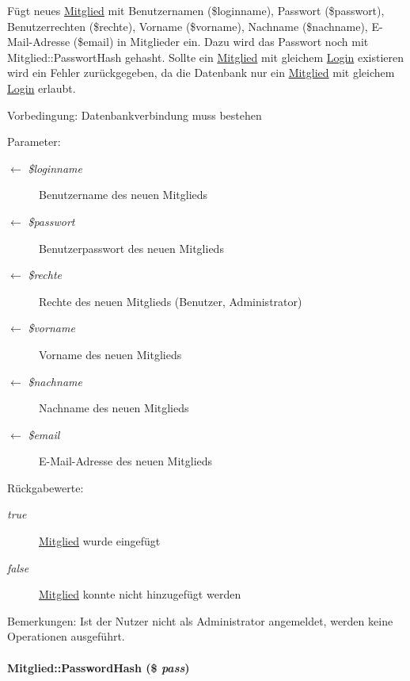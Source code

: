 Fügt neues \hyperlink{classMitglied}{Mitglied} mit Benutzernamen (\$loginname), Passwort (\$passwort), Benutzerrechten (\$rechte), Vorname (\$vorname), Nachname (\$nachname), E-Mail-Adresse (\$email) in Mitglieder ein. Dazu wird das Passwort noch mit Mitglied::Passwort\-Hash gehasht. Sollte ein \hyperlink{classMitglied}{Mitglied} mit gleichem \hyperlink{classLogin}{Login} existieren wird ein Fehler zurückgegeben, da die Datenbank nur ein \hyperlink{classMitglied}{Mitglied} mit gleichem \hyperlink{classLogin}{Login} erlaubt. \begin{Desc}
\item[Vorbedingung:]Datenbankverbindung muss bestehen \end{Desc}
\begin{Desc}
\item[Parameter:]
\begin{description}
\item[\mbox{$\leftarrow$} {\em \$loginname}]Benutzername des neuen Mitglieds \item[\mbox{$\leftarrow$} {\em \$passwort}]Benutzerpasswort des neuen Mitglieds \item[\mbox{$\leftarrow$} {\em \$rechte}]Rechte des neuen Mitglieds (Benutzer, Administrator) \item[\mbox{$\leftarrow$} {\em \$vorname}]Vorname des neuen Mitglieds \item[\mbox{$\leftarrow$} {\em \$nachname}]Nachname des neuen Mitglieds \item[\mbox{$\leftarrow$} {\em \$email}]E-Mail-Adresse des neuen Mitglieds \end{description}
\end{Desc}
\begin{Desc}
\item[R\"{u}ckgabewerte:]
\begin{description}
\item[{\em true}]\hyperlink{classMitglied}{Mitglied} wurde eingefügt \item[{\em false}]\hyperlink{classMitglied}{Mitglied} konnte nicht hinzugefügt werden \end{description}
\end{Desc}
\begin{Desc}
\item[Bemerkungen:]Ist der Nutzer nicht als Administrator angemeldet, werden keine Operationen ausgeführt. \end{Desc}
\hypertarget{classMitglied_9b13db80866c22bf992e73f2eb75e369}{
\paragraph[PasswordHash]{\setlength{\rightskip}{0pt plus 5cm}Mitglied::Password\-Hash (\$ {\em pass})}\hfill}
\label{classMitglied_9b13db80866c22bf992e73f2eb75e369}


